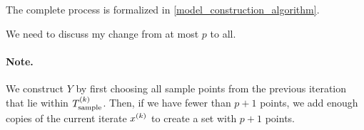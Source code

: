 \documentclass{article}
\begin{document}
The complete process is formalized in \cref{model_construction_algorithm}.


\color{magenta}
We need to discuss my change from at most $p$ to all.
\color{black}
\paragraph*{Note.}
We construct $Y$ by first choosing  {all} sample points from the previous iteration that lie within ${T_{\text{sample}}^{(k)}}$.
Then, if we have fewer than $p+1$ points, we add enough copies of the current iterate $x^{(k)}$ to create a set with $p+1$ points.
\end{document}
